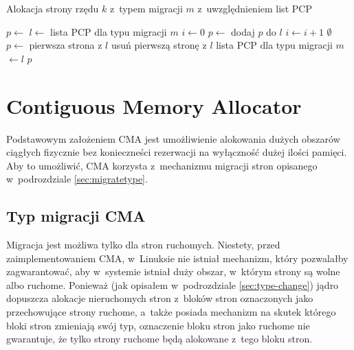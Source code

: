 \begin{algorithm}\label{alg:buddy-pcp}
\caption{Alokacja strony rzędu $k$ z~typem migracji $m$
  z~uwzględnieniem list PCP}
\begin{algorithmic}[1]
        \State $p \gets$ 
    \Else
        \State $l \gets$ lista PCP dla typu migracji $m$
            \State $i \gets 0$
            \Repeat
                \State $p \gets$ 
                    \State dodaj $p$ do $l$
                    \State $i \gets i + 1$
                \EndIf
             
        \EndIf
            \State \Return $\emptyset$
        \Else
            \State $p \gets$ pierwsza strona z $l$
            \State usuń pierwszą stronę z $l$
            \State lista PCP dla typu migracji $m$ $\gets l$
        \EndIf
    \EndIf
    \State \Return $p$
\EndFunction
\end{algorithmic}
\end{algorithm}


\chapter{Contiguous Memory Allocator}\label{sec:cma}

Podstawowym założeniem CMA jest umożliwienie alokowania dużych
obszarów ciągłych fizycznie bez konieczneści rezerwacji na wyłączność
dużej ilości pamięci.  Aby to umożliwić, CMA korzysta z~mechanizmu
migracji stron opisanego w~podrozdziale \ref{sec:migratetype}.

\section{Typ migracji CMA}\label{sec:migrate-cma}

Migracja jest możliwa tylko dla stron ruchomych.  Niestety, przed
zaimplementowaniem CMA, w~Linuksie nie istniał mechanizm, który
pozwalałby zagwarantować, aby w~systemie istniał duży obszar, w~którym
strony są wolne albo ruchome.  Ponieważ (jak opisałem w~podrozdziale
\ref{sec:type-change}) jądro dopuszcza alokacje nieruchomych stron
z~bloków stron oznaczonych jako przechowujące strony ruchome, a~także
posiada mechanizm na skutek którego bloki stron zmieniają swój typ,
oznaczenie bloku stron jako ruchome nie gwarantuje, że tylko strony
ruchome będą alokowane z~tego bloku stron.

